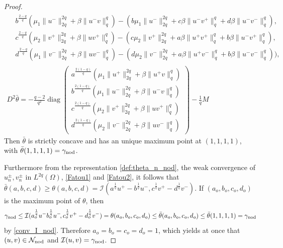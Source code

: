 \documentclass[reqno]{amsart}
\begin{document}
\begin{proof}
\begin{gather*}
\begin{aligned}
& b^{\frac{2-q}q}(\mu_1\|u^-\|_{2q}^{2q} +\beta\|u^-v\|_q^q)
  - (b \mu_1\|u^-\|_{2q}^{2q} +c\beta \|u^-v^+\|_q^q +d \beta \|u^-v^-\|_q^q),\\
&  c^{\frac{2-q}q}(\mu_2\|v^+\|_{2q}^{2q} +\beta\|uv^+\|_q^q)
 - (c \mu_2\|v^+\|_{2q}^{2q} +a\beta \|u^+v^+\|_q^q +b \beta \|u^-v^+\|_q^q),\\
& d^{\frac{2-q}q}(\mu_1\|v^-\|_{2q}^{2q} +\beta\|uv^-\|_q^q)
 - (d \mu_2\|v^-\|_{2q}^{2q} +a\beta \|u^+v^-\|_q^q +b \beta \|u^-v^-\|_q^q)
 \Big),
\end{aligned} \\
 D^2\bar\theta
 = -\frac{q-2}{q^2} \operatorname{diag}
\begin{pmatrix}
 a^{\frac{2(1-q)}q}(\mu_1\|u^+\|_{2q}^{2q} +\beta\|u^+v\|_q^q) \\
 b^{\frac{2(1-q)}q}(\mu_1\|u^-\|_{2q}^{2q} +\beta\|u^-v\|_q^q) \\
 c^{\frac{2(1-q)}q}(\mu_2\|v^+\|_{2q}^{2q} +\beta\|uv^+\|_q^q) \\
 d^{\frac{2(1-q)}q}(\mu_2\|v^-\|_{2q}^{2q} +\beta\|uv^-\|_q^q)
 \end{pmatrix}
- \frac{1}q M
\end{gather*}
Then  $\bar\theta$ is strictly concave and has an unique maximum point at
$(1,1,1,1)$, with $\bar\theta(1,1,1,1)= \gamma_{\rm nod}$.

Furthermore from the representation \eqref{def:theta_n_nod},  the weak convergence
of $u^{\pm}_n, v^{\pm}_n$ in $L^{2q}(\Omega)$, \eqref{Fatou1} and \eqref{Fatou2},
it follows that
$\bar \theta (a,b,c,d)\ge \theta (a,b,c,d)
=\mathcal I(a^{\frac{1}q}u^+\!-b^{\frac{1}q}u^-,c^{\frac{1}q}v^+\! - d^{\frac{1}q}v^-)$.
If $(a_o,b_o,c_o,d_o)$ is the maximum point of $\theta$, then
\[
\gamma_{\rm nod}\le \mathcal I (a_o^{\frac{1}q}u^-b_o^{\frac{1}q}u^-\!,c_o^{\frac{1}q}v^+-
d_o^{\frac{1}q}v^-)
=\theta(a_o,b_o,c_o,d_o) \le \bar\theta(a_o,b_o,c_o,d_o)
\le \bar \theta(1,1,1,1)=\gamma_{\rm nod}
\]
by \eqref{conv_I_nod}.
Therefore $a_o=b_o=c_o=d_o=1$, which yields at once that $(u,v)\in \mathcal N_{\rm nod}$
and $\mathcal I(u,v)=\gamma_{\rm nod}$.
\smallskip


\end{proof}
\end{document}
